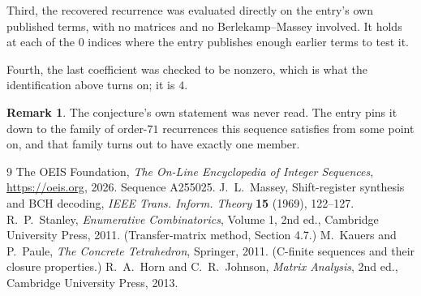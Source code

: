 \documentclass[11pt,a4paper]{article}
\theoremstyle{plain}
\theoremstyle{definition}
\newtheorem{remark}[theorem]{Remark}
\begin{document}
Third, the recovered recurrence was evaluated directly on the entry's own published terms, with
no matrices and no Berlekamp--Massey involved. It holds at each of the $0$ indices where
the entry publishes enough earlier terms to test it.

Fourth, the last coefficient was checked to be nonzero, which is what the identification above
turns on; it is $4$.

\begin{remark}
The conjecture's own statement was never read. The entry pins it down to the family of
order-$71$ recurrences this sequence satisfies from some point on, and that family turns
out to have exactly one member.
\end{remark}

\begin{thebibliography}{9}
 The OEIS Foundation, \emph{The On-Line Encyclopedia of Integer
Sequences}, \url{https://oeis.org}, 2026. Sequence A255025.
 J.~L.~Massey, Shift-register synthesis and BCH decoding, \emph{IEEE
Trans. Inform. Theory} \textbf{15} (1969), 122--127.
 R.~P.~Stanley, \emph{Enumerative Combinatorics}, Volume 1, 2nd ed.,
Cambridge University Press, 2011. (Transfer-matrix method, Section 4.7.)
 M.~Kauers and P.~Paule, \emph{The Concrete Tetrahedron}, Springer, 2011.
(C-finite sequences and their closure properties.)
 R.~A.~Horn and C.~R.~Johnson, \emph{Matrix Analysis}, 2nd ed., Cambridge
University Press, 2013.
\end{thebibliography}
\end{document}
